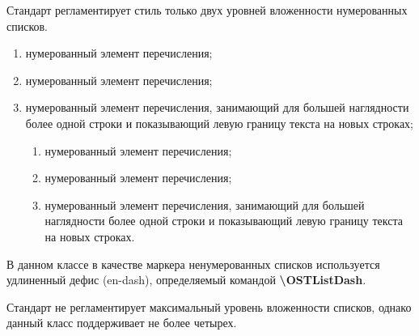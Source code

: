 \documentclass[12pt, twoside, final]{ruost}
\newcommand{\txtcmd}[1]{\textbf{\backslash{}#1}}
\begin{document}
\begin{OST}
				\point Стандарт регламентирует стиль только двух уровней вложенности нумерованных списков.
				
				\begin{enumerate}
					\item нумерованный элемент перечисления;
					\item нумерованный элемент перечисления;
					\item нумерованный элемент перечисления, занимающий для большей наглядности более одной строки и показывающий левую границу текста на новых строках;
					\begin{enumerate}
						\item нумерованный элемент перечисления;
						\item нумерованный элемент перечисления;
						\item нумерованный элемент перечисления, занимающий для большей наглядности более одной строки и показывающий левую границу текста на новых строках.
					\end{enumerate}
				\end{enumerate}
				
				\point В данном классе в качестве маркера ненумерованных списков используется удлиненный дефис (en-dash), определяемый командой \txtcmd{OSTListDash}.
				
				\point Стандарт не регламентирует максимальный уровень вложенности списков, однако данный класс поддерживает не более четырех.
				

\end{OST}
\end{document}
